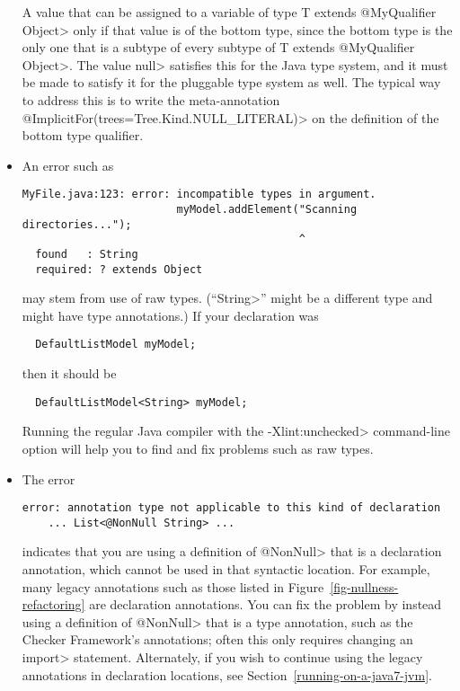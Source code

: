 \begin{itemize}
\noindent
A value that can be assigned to a variable of type \<T extends @MyQualifier
Object> only if that value is of the bottom type, since the bottom type is
the only one that is a subtype of every subtype of \<T extends @MyQualifier
Object>.  The value \<null> satisfies this for the Java type system, and it
must be made to satisfy it for the pluggable type system as well.  The
typical way to address this is to write the meta-annotation
\<@ImplicitFor(trees={Tree.Kind.NULL\_LITERAL})> on the definition of the
bottom type qualifier.

\item
An error such as 

\begin{Verbatim}
MyFile.java:123: error: incompatible types in argument.
                        myModel.addElement("Scanning directories...");
                                           ^
  found   : String
  required: ? extends Object
\end{Verbatim}

\noindent
may stem from use of raw types.  (``\<String>'' might be a different type
and might have type annotations.)  If your declaration was

\begin{Verbatim}
  DefaultListModel myModel;
\end{Verbatim}

\noindent
then it should be
\begin{Verbatim}
  DefaultListModel<String> myModel;
\end{Verbatim}

Running the regular Java compiler with the \<-Xlint:unchecked> command-line
option will help you to find and fix problems such as raw types.


\item
The error

\begin{Verbatim}
error: annotation type not applicable to this kind of declaration
    ... List<@NonNull String> ...
\end{Verbatim}

\noindent
indicates that you are using a definition of \<@NonNull> that is a
declaration annotation, which cannot be used in that syntactic location.
For example, many legacy annotations such as those listed in
Figure~\ref{fig-nullness-refactoring} are declaration annotations.  You can
fix the problem by instead using a definition of \<@NonNull> that is a type
annotation, such as the Checker Framework's annotations; often this only
requires changing an \<import> statement.
Alternately, if you wish to continue using the legacy annotations in
declaration locations, see Section~\ref{running-on-a-java7-jvm}.



\end{itemize}

